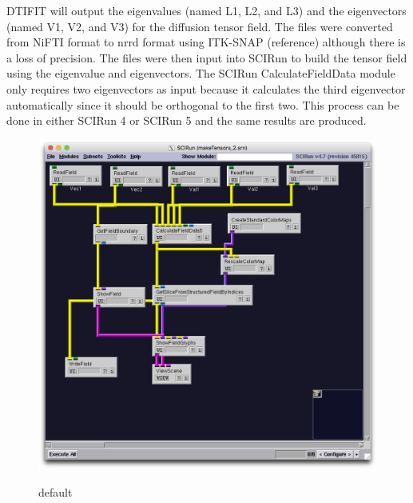DTIFIT will output the eigenvalues (named L1, L2, and L3) and the eigenvectors (named V1, V2, and V3) for the diffusion tensor field. The files were converted from NiFTI format to nrrd format using ITK-SNAP (reference) although there is a loss of precision. The files were then input into SCIRun to build the tensor field using the eigenvalue and eigenvectors. The SCIRun CalculateFieldData module only requires two eigenvectors as input because it calculates the third eigenvector automatically since it should be orthogonal to the first two. This process can be done in either SCIRun 4 or SCIRun 5 and the same results are produced. 

\begin{figure}[p]
\begin{center}
\includegraphics[width=\textwidth]{Figures/make_DTI.png}\\
\caption{default}
\label{default}
\end{center}
\end{figure}

